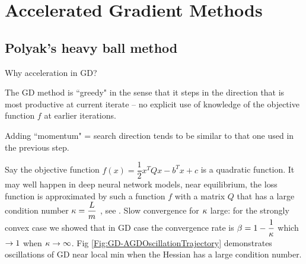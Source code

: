\chapter{Accelerated Gradient Methods}
\label{Ch:AcceleratedGD}

\section{Polyak's heavy ball method}

Why acceleration in GD?

The GD method is ``greedy" in the sense that it steps in the direction that is most productive at current iterate
-- no explicit use of knowledge of the objective function $f$ at earlier iterations.

Adding ``momentum" = search direction tends to be similar to that one used in the previous step.

Say the objective function $f(x)=\dfrac{1}{2}x^TQx-b^Tx+c$ is a quadratic function. It may well happen in deep neural network models, near equilibrium, the loss function is approximated by such a function $f$ with a matrix $Q$ that has a large condition number $\kappa=\dfrac{L}{m}$
, see \cite{SGDVariationalICLR2018}.
Slow convergence for $\kappa$ large: for the strongly convex case we showed that in GD case the convergence rate is  $\beta=1-\dfrac{1}{\kappa}$ which $\rightarrow 1$ when $\kappa\rightarrow\infty$. Fig \ref{Fig:GD-AGDOscillationTrajectory} demonstrates oscillations of GD near local min when the Hessian has a large condition number.

